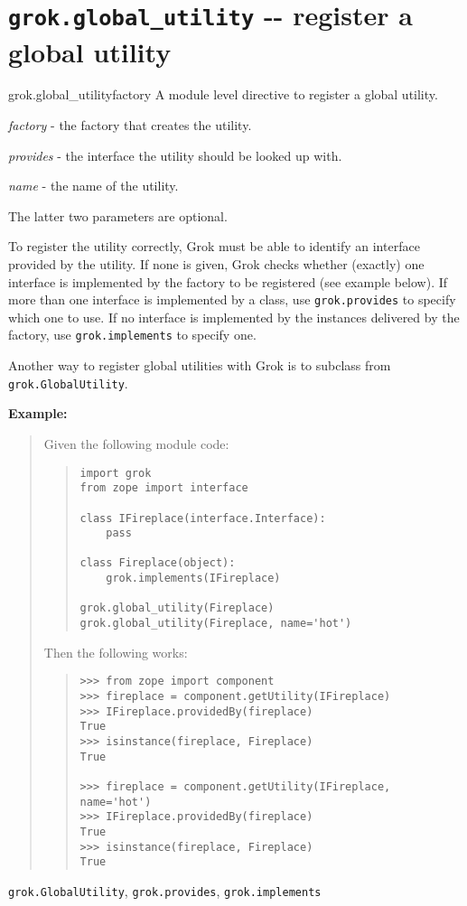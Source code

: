 \documentclass[10pt,a4paper,english]{manual}
\newcommand{\titlereference}[1]{\textsl{#1}}
\begin{document}
\section{\texttt{grok.global{\_}utility} -{}- register a global utility}
\begin{funcdesc}{grok.global{\_}utility}{factory}
A module level directive to register a global utility.

\titlereference{factory} - the factory that creates the utility.

\titlereference{provides} - the interface the utility should be looked up with.

\titlereference{name} - the name of the utility.

The latter two parameters are optional.

To register the utility correctly, Grok must be able to identify an
interface provided by the utility. If none is given, Grok checks
whether (exactly) one interface is implemented by the factory to be
registered (see example below). If more than one interface is
implemented by a class, use \texttt{grok.provides} to specify which
one to use. If no interface is implemented by the instances
delivered by the factory, use \texttt{grok.implements} to specify
one.

Another way to register global utilities with Grok is to subclass
from \texttt{grok.GlobalUtility}.

\textbf{Example:}
\begin{quote}

Given the following module code:
\begin{quote}\begin{verbatim}
import grok
from zope import interface

class IFireplace(interface.Interface):
    pass

class Fireplace(object):
    grok.implements(IFireplace)

grok.global_utility(Fireplace)
grok.global_utility(Fireplace, name='hot')
\end{verbatim}\end{quote}

Then the following works:
\begin{quote}\begin{verbatim}
>>> from zope import component
>>> fireplace = component.getUtility(IFireplace)
>>> IFireplace.providedBy(fireplace)
True
>>> isinstance(fireplace, Fireplace)
True

>>> fireplace = component.getUtility(IFireplace, name='hot')
>>> IFireplace.providedBy(fireplace)
True
>>> isinstance(fireplace, Fireplace)
True
\end{verbatim}\end{quote}
\end{quote}
\begin{seealso}

\texttt{grok.GlobalUtility}, \texttt{grok.provides},
\texttt{grok.implements}
\end{seealso}

\end{funcdesc}
\end{document}
